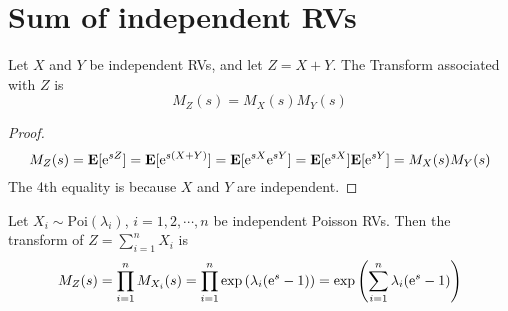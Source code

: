 \documentclass[device=normal, lang=en]{elegantbook}
\numberwithin{equation}{section}
\begin{document}
\section{Sum of independent RVs}
\begin{theorem}
    Let $X$ and $Y$ be independent RVs, and let $Z = X + Y$. The Transform associated with $Z$ is
    \begin{equation}
        M_{Z}(s) = M_{X}(s) M_{Y}(s)
    \end{equation}
\end{theorem}
\begin{proof}
    \begin{equation}
        M_{Z}(s) = \mathbf{E}[\mathrm{e}^{sZ}] = \mathbf{E}[\mathrm{e}^{s(X + Y)}] = \mathbf{E}[\mathrm{e}^{sX} \mathrm{e}^{sY}] = \mathbf{E}[\mathrm{e}^{sX}] \mathbf{E}[\mathrm{e}^{sY}] = M_{X}(s) M_{Y}(s)
    \end{equation}
    The 4th equality is because $X$ and $Y$ are independent.
\end{proof}
\begin{example}
    Let $X_i \sim \text{Poi}(\lambda_i)$, $i = 1, 2, \cdots, n$ be independent Poisson RVs. Then the transform of $Z = \sum_{i=1}^{n} X_i$ is
    \begin{equation}
        M_{Z}(s) = \prod_{i=1}^{n} M_{X_i}(s) = \prod_{i=1}^{n} \exp\qty(\lambda_i(\mathrm{e}^{s} - 1)) = \exp\qty(\sum_{i=1}^{n} \lambda_i(\mathrm{e}^{s} - 1))
    \end{equation}
\end{example}
\end{document}
